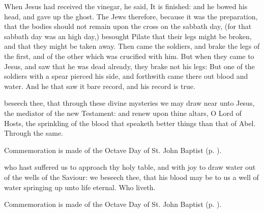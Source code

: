 
\vspace{-1ex}

 When Jesus had received the vinegar, he said, It is finished: and he bowed his head, and gave up the ghost. The Jews therefore, because it was the preparation, that the bodies should not remain upon the cross on the sabbath day, (for that sabbath day was an high day,) besought Pilate that their legs might be broken, and that they might be taken away. Then came the soldiers, and brake the legs of the first, and of the other which was crucified with him. But when they came to Jesus, and saw that he was dead already, they brake not his legs: But one of the soldiers with a spear pierced his side, and forthwith came there out blood and water. And he that saw it bare record, and his record is true.


\vspace{-2.5ex}

\secret
{} beseech thee, that through these divine mysteries we may draw near unto Jesus, the mediator of the new Testament: and renew upon thine altars, O Lord of Hosts, the sprinkling of the blood that speaketh better things than that of Abel. Through the same.

\begin{rubric}
    Commemoration is made of the Octave Day of St. John Baptist (p. \pageref{JohnSecret}).
\end{rubric}

\vspace{-2.5ex}


\vspace{-1ex}

\postcommunion
{} who hast suffered us to approach thy holy table, and with joy to draw water out of the wells of the Saviour: we beseech thee, that his blood may be to us a well of water springing up unto life eternal. Who liveth.
\begin{rubric}
    Commemoration is made of the Octave Day of St. John Baptist (p. \pageref{JohnPC}).
\end{rubric}


